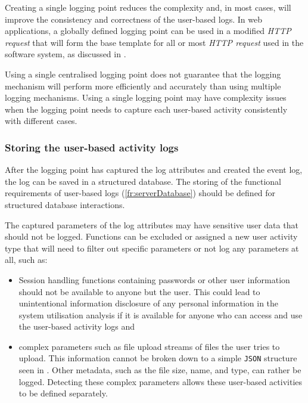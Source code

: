 Creating a single logging point reduces the complexity and, in most cases, will improve the consistency and correctness of the user-based logs. In web applications, a globally defined logging point can be used in a modified \textit{HTTP request} that will form the base template for all or most \textit{HTTP request} used in the software system, as discussed in . \par Using a single centralised logging point does not guarantee that the logging mechanism will perform more efficiently and accurately than using multiple logging mechanisms. Using a single logging point may have complexity issues when the logging point needs to capture each user-based activity consistently with different cases.

\subsubsection{Storing the user-based activity logs}\label{sec:ch2_databaseStorage}
After the logging point has captured the log attributes and created the event log, the log can be saved in a structured database. The storing of the functional requirements of user-based logs (\ref{fr:serverDatabase}) should be defined for structured database interactions.\par The captured parameters of the log attributes may have sensitive user data that should not be logged. Functions can be excluded or assigned a new user activity type that will need to filter out specific parameters or not log any parameters at all, such as:

\begin{itemize}
	\item Session handling functions containing passwords or other user information should not be available to anyone but the user. This could lead to unintentional information disclosure of any personal information in the system utilisation analysis if it is available for anyone who can access and use the user-based activity logs and
	\item complex parameters such as file upload streams of files the user tries to upload. This information cannot be broken down to a simple \texttt{JSON} structure seen in . Other metadata, such as the file size, name, and type, can rather be logged. Detecting these complex parameters allows these user-based activities to be defined separately.
\end{itemize}

